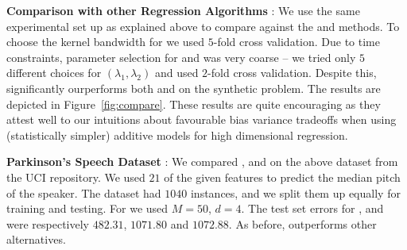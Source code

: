 \textbf{Comparison with other Regression Algorithms} :
We use the same experimental set up as explained above to compare \addkrrs
against the \krrs and \nws methods. To choose the kernel bandwidth for \nws  
we used $5$-fold cross validation. Due to time constraints, parameter selection 
 for \addkrrs and \krrs was very coarse -- we tried only $5$ different choices
for $(\lambda_1, \lambda_2)$ and used $2$-fold cross validation.
Despite this, \addkrrs significantly ourperforms both \krrs and \nws on the
synthetic problem. The results are depicted in Figure~\ref{fig:compare}. These
results are quite encouraging as they attest well to our intuitions about
favourable bias variance tradeoffs when using (statistically simpler) additive
models for high dimensional regression.

\textbf{Parkinson's Speech Dataset} :
We compared \addkrr, \krrs and \nws on the above dataset from the UCI
repository. We used $21$ of the given features to predict the median pitch of
the speaker. The dataset had $1040$ instances, and we split them up equally for
training and testing. For \addkrrs we used $M = 50$, $d=4$. The test set errors
for \addkrr, \krrs and \nws were respectively $482.31$, $1071.80$ and
$1072.88$.
As before, \addkrrs outperforms other alternatives.

